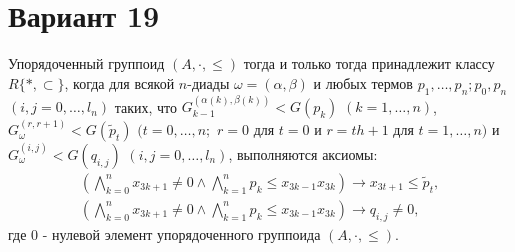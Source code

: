 \documentclass{article}
\begin{document}
\section*{Вариант 19}

Упорядоченный группоид $(A,\cdot,\le)$ тогда и только тогда принадлежит классу $R\{*,\subset\}$, когда для всякой $n$-диады $\omega=(\alpha,\beta)$ и любых термов $p_1,\ldots, p_n; p_0, p_n$ $(i,j=0,\ldots,l_{n})$ таких, что $G_{k-1}^{(\alpha(k),\beta(k))}<G(p_{k})$ $(k=1,\ldots,n)$, $G_{\omega}^{(r,r+1)}<G(\tilde{p}_{t})$ $(t=0,\ldots,n;$ $r=0$ для $t=0$ и $r=th+1$ для $t=1,\ldots,n)$ и $G_{\omega}^{(i,j)}<G(q_{i,j})$ $(i, j = 0,\ldots, l_n)$, выполняются аксиомы:
\begin{gather*}
\left(\bigwedge_{k=0}^{n}x_{3k+1}\ne0\wedge\bigwedge_{k=1}^{n}p_{k}\le x_{3k-1}x_{3k}\right)\rightarrow x_{3t+1}\le\tilde{p}_{t}, \\
\left(\bigwedge_{k=0}^{n}x_{3k+1}\ne0\wedge\bigwedge_{k=1}^{n}p_{k}\le x_{3k-1}x_{3k}\right)\rightarrow q_{i,j}\ne0,
\end{gather*}
где 0 - нулевой элемент упорядоченного группоида $(A,\cdot,\le)$.
\end{document}
